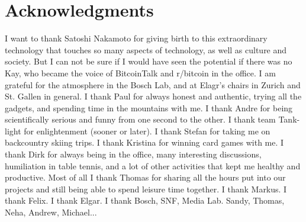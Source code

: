 
\begingroup
\let\clearpage\relax
\let\cleardoublepage\relax
\let\cleardoublepage\relax

\chapter*{Acknowledgments}

I want to thank Satoshi Nakamoto for giving birth to this extraordinary technology that touches so many aspects of technology, as well as culture and society. But I can not be sure if I would have seen the potential if there was no Kay, who became the voice of BitcoinTalk and r/bitcoin in the office. I am grateful for the atmosphere in the Bosch Lab, and at Elagr's chairs in Zurich and St. Gallen in general. I thank Paul for always honest and authentic, trying all the gadgets, and spending time in the mountains with me. I thank Andre for being scientifically serious and funny from one second to the other. I thank team Tank-light for enlightenment (sooner or later). I thank Stefan for taking me on backcountry skiing trips. I thank Kristina for winning card games with me. I thank Dirk for always being in the office, many interesting discussions, humiliation in table tennis, and a lot of other activities that kept me healthy and productive. Most of all I thank Thomas for sharing all the hours put into our projects and still being able to spend leisure time together. I thank Markus. I thank Felix. I thank Elgar. I thank Bosch, SNF, Media Lab. Sandy, Thomas, Neha, Andrew, Michael... 



\endgroup
